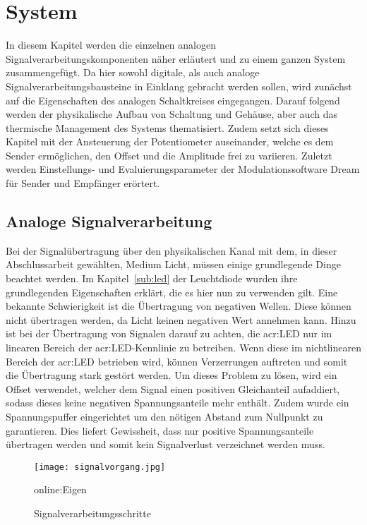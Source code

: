 
\chapter{System}
\label{sec:system}
In diesem Kapitel werden die einzelnen analogen Signalverarbeitungskomponenten näher erläutert und zu einem ganzen System zusammengefügt. Da hier sowohl digitale, als auch analoge Signalverarbeitungsbausteine in Einklang gebracht werden sollen, wird zunächst auf die Eigenschaften des analogen Schaltkreises eingegangen. Darauf folgend werden der physikalische Aufbau von Schaltung und Gehäuse, aber auch das thermische Management des Systems thematisiert. Zudem setzt sich dieses Kapitel mit der Ansteuerung der Potentiometer auseinander, welche es dem Sender ermöglichen, den Offset und die Amplitude frei zu variieren. Zuletzt werden Einstellungs- und Evaluierungsparameter der Modulationssoftware Dream für Sender und Empfänger erörtert.


\section{Analoge Signalverarbeitung}
\label{sec:Signalverarbeitung}
Bei der Signalübertragung über den physikalischen Kanal mit dem, in dieser Abschlussarbeit gewählten, Medium Licht, müssen einige grundlegende Dinge beachtet werden. Im Kapitel~\ref{sub:led} der Leuchtdiode wurden ihre grundlegenden Eigenschaften erklärt, die es hier nun zu verwenden gilt. Eine bekannte Schwierigkeit ist die Übertragung von negativen Wellen. Diese können nicht übertragen werden, da Licht keinen negativen Wert annehmen kann. Hinzu ist bei der Übertragung von Signalen darauf zu achten, die \gls{acr:LED} nur im linearen Bereich der \gls{acr:LED}-Kennlinie zu betreiben. Wenn diese im nichtlinearen Bereich der \gls{acr:LED} betrieben wird, können Verzerrungen auftreten und somit die Übertragung stark gestört werden. Um dieses Problem zu lösen, wird ein Offset verwendet, welcher dem Signal einen positiven Gleichanteil aufaddiert, sodass dieses keine negativen Spannungsanteile mehr enthält. Zudem wurde ein Spannungspuffer eingerichtet um den nötigen Abstand zum Nullpunkt zu garantieren. Dies liefert Gewissheit, dass nur positive Spannungsanteile übertragen werden und somit kein Signalverlust verzeichnet werden muss.

\begin{figure}[H]
	\centering
	\texttt{[image: signalvorgang.jpg]}
	\caption[Signalverarbeitungsschritte]{Signalverarbeitungsschritte} \gls{online:Eigen}
	\label{fig:signalvorgang}
\end{figure}

